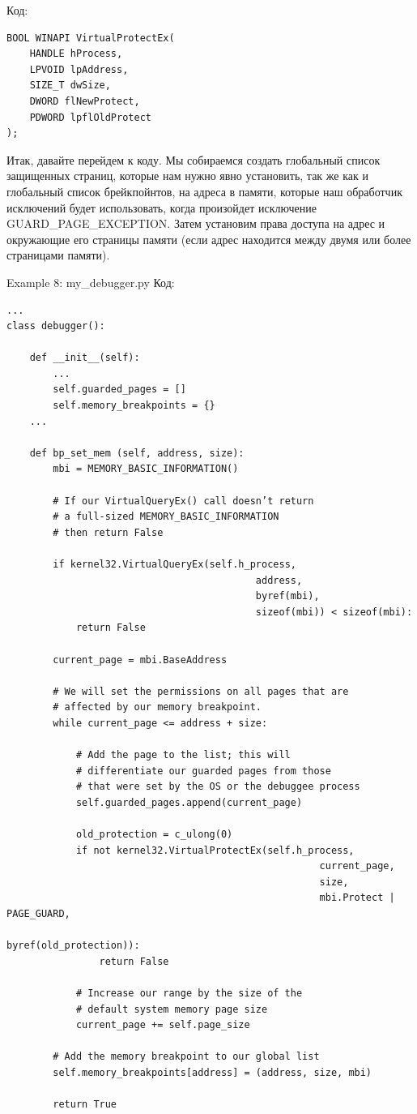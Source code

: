 \documentclass[12pt, a4paper, oneside]{book}
\begin{document}
Код:
\begin{verbatim}
BOOL WINAPI VirtualProtectEx(
    HANDLE hProcess,
    LPVOID lpAddress,
    SIZE_T dwSize,
    DWORD flNewProtect,
    PDWORD lpflOldProtect
);
\end{verbatim}

Итак, давайте перейдем к коду. Мы собираемся создать глобальный список защищенных страниц, которые нам нужно явно установить, так же как и глобальный список брейкпойнтов, на адреса в памяти, которые наш обработчик исключений будет использовать, когда произойдет исключение GUARD\_PAGE\_EXCEPTION. Затем установим права доступа на адрес и окружающие его страницы памяти (если адрес находится между двумя или более страницами памяти).

Example 8: my\_debugger.py
Код:
\begin{verbatim}
...
class debugger():

    def __init__(self):
        ...
        self.guarded_pages = []
        self.memory_breakpoints = {}
    ...

    def bp_set_mem (self, address, size):
        mbi = MEMORY_BASIC_INFORMATION()

        # If our VirtualQueryEx() call doesn’t return
        # a full-sized MEMORY_BASIC_INFORMATION
        # then return False

        if kernel32.VirtualQueryEx(self.h_process,
                                           address,
                                           byref(mbi),
                                           sizeof(mbi)) < sizeof(mbi):
            return False

        current_page = mbi.BaseAddress

        # We will set the permissions on all pages that are
        # affected by our memory breakpoint.
        while current_page <= address + size:

            # Add the page to the list; this will
            # differentiate our guarded pages from those
            # that were set by the OS or the debuggee process
            self.guarded_pages.append(current_page)

            old_protection = c_ulong(0)
            if not kernel32.VirtualProtectEx(self.h_process,
                                                      current_page,
                                                      size,
                                                      mbi.Protect | PAGE_GUARD,
                                                      byref(old_protection)):
                return False

            # Increase our range by the size of the
            # default system memory page size
            current_page += self.page_size

        # Add the memory breakpoint to our global list
        self.memory_breakpoints[address] = (address, size, mbi)

        return True
\end{verbatim}
\end{document}
